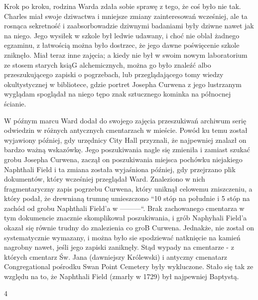 Krok po kroku, rodzina Warda zdała sobie sprawę z tego, że coś było nie tak. Charles miał swoje dziwactwa i mniejsze zmiany zainteresowań wcześniej, ale ta rosnąca sekretność i zaabsorbowadzie dziwnymi badaniami były dziwne nawet jak na niego. Jego wysiłek w szkole był ledwie udawany, i choć nie oblał żadnego egzaminu, z łatwością można było dostrzec, że jego dawne poświęcenie szkole zniknęło. Miał teraz inne zajęcia; a kiedy nie był w swoim nowym laboratorium ze stosem starych ksiąG alchemicznych, można go było znaleźć albo przeszukującego zapiski o pogrzebach, lub przeglądającego tomy wiedzy okultystycznej w bibliotece, gdzie portret Josepha Curwena z jego lustrzanym wyglądam spoglądał na niego tępo znak sztucznego kominka na północnej ścianie.

W późnym marcu Ward dodał do swojego zajęcia przeszukiwań archiwum serię odwiedzin w różnych antycznych cmentarzach w mieście. Powód ku temu został wyjawiony później, gdy urzędnicy City Hall przyznali, że najpewniej znalazł on bardzo ważną wskazówkę. Jego poszukiwania nagle się zmieniła i zamiast szukać grobu Josepha Curwena, zaczął on poszukiwania miejsca pochówku niejakiego Naphthali Field i ta zmiana została wyjaśniona później, gdy przejrzano plik dokumentów, który wcześniej przeglądał Ward. Znaleziono w nich fragmentaryczny zapis pogrzebu Curwena, który uniknął celowemu zniszczeniu, a który podał, że drewnianą trumnę umieszczono ``10 stóp na południe i 5 stóp na zachód od grobu Naphthali Field'a w ———``. Brak zachowanego cmentarza w tym dokumencie znacznie skomplikował poszukiwania, i grób Naphyhali Field'a okazał się równie trudny do znalezienia co groB Curwena. Jednakże, nie został on systematycznie wymazany, i można było sie spodziewać natknięcie na kamień nagrobny nawet, jeśli jego zapiski zaniknęły. Stąd wypady na cmentarze - z których cmentarz Św. Jana (dawniejszy Królewski) i antyczny cmenatarz Congregational pośrodku Swan Point Cemetery były wykluczone. Stało się tak ze względu na to, że Naphthali Field (zmarły w 1729) był najpewniej Baptystą. 

\begin{center}
4
\end{center}

